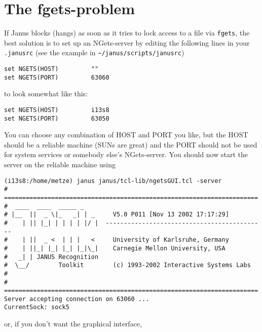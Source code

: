 \section{The fgets-problem} \label{trouble:fgets}

If Janus blocks (hangs) as soon  as it tries to lock  access to a file
via \texttt{fgets}, the best solution is to set  up an NGets-server by
editing the following lines in your \texttt{.janusrc} (see the example
in \texttt{\~{ }/janus/scripts/janusrc})

\begin{verbatim}
set NGETS(HOST)         ""
set NGETS(PORT)         63060
\end{verbatim}

to look somewhat like this:

\begin{verbatim}
set NGETS(HOST)         i13s8
set NGETS(PORT)         63050
\end{verbatim}

You can choose any combination of HOST and PORT you like, but the HOST
should be a reliable machine (SUNs are  great) and the PORT should not
be  used  for system services  or  somebody  else's  NGets-server. You
should now start the server on the reliable machine using

\begin{verbatim}
(i13s8:/home/metze) janus janus/tcl-lib/ngetsGUI.tcl -server
# ======================================================================
#  ____  ____  _____ _                                                  
# |__  ||  _ \|_   _| | _     V5.0 P011 [Nov 13 2002 17:17:29]
#    | || |_| | | | | |/ |  --------------------------------------------
#    | ||  _ <  | | |   <     University of Karlsruhe, Germany            
#    | ||_| |_| |_| |_|\_|    Carnegie Mellon University, USA            
#   _| | JANUS Recognition                                              
#  \__/        Toolkit        (c) 1993-2002 Interactive Systems Labs   
#                                                                       
# ======================================================================
Server accepting connection on 63060 ...
CurrentSock: sock5
\end{verbatim}

or, if you don't want the graphical interface,

